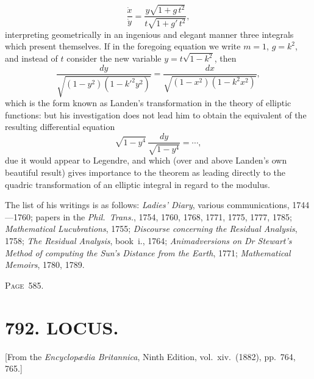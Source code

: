 \documentclass[11pt,a4paper]{book}
\begin{document}
\[
\frac{\dot{x}}{\dot{y}}=\frac{y\sqrt{1+g\,t^2}}{t\sqrt{1+g'\,t^2}},
\]
interpreting geometrically in an ingenious and elegant manner three integrals which present themselves. If in the foregoing equation we write $m=1$, $g=k^2$, and instead of $t$ consider the new variable $y=t\sqrt{1-k^2}$, then
\[
\frac{dy}{\sqrt{(1-y^2)(1-k'^2y^2)}}=\frac{dx}{\sqrt{(1-x^2)(1-k^2x^2)}},
\]
which is the form known as Landen's transformation in the theory of elliptic functions: but his investigation does not lead him to obtain the equivalent of the resulting differential equation
\[
\sqrt{1-y^4}\,\frac{dy}{\sqrt{1-y^4}}=\cdots,
\]
due it would appear to Legendre, and which (over and above Landen's own beautiful result) gives importance to the theorem as leading directly to the quadric transformation of an elliptic integral in regard to the modulus.

The list of his writings is as follows: \textit{Ladies' Diary}, various communications, 1744---1760; papers in the \textit{Phil.\ Trans.}, 1754, 1760, 1768, 1771, 1775, 1777, 1785; \textit{Mathematical Lucubrations}, 1755; \textit{Discourse concerning the Residual Analysis}, 1758; \textit{The Residual Analysis}, book~i., 1764; \textit{Animadversions on Dr Stewart's Method of computing the Sun's Distance from the Earth}, 1771; \textit{Mathematical Memoirs}, 1780, 1789.

\newpage
\noindent\textsc{Page~585.}

\section*{792. LOCUS.}

\begin{flushright}
\small[From the \textit{Encyclop{\ae}dia Britannica}, Ninth Edition, vol.~xiv.~(1882), pp.~764, 765.]
\end{flushright}
\end{document}
